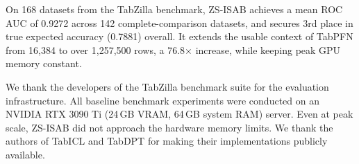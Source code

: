 \documentclass{article}
\begin{document}
On 168 datasets from the TabZilla benchmark, ZS-ISAB achieves a mean ROC AUC of 0.9272 across 142 complete-comparison datasets, and secures 3rd place in true expected accuracy (0.7881) overall. It extends the usable context of TabPFN from 16{,}384 to over 1{,}257{,}500 rows, a 76.8$\times$ increase, while keeping peak GPU memory constant.

We thank the developers of the TabZilla benchmark suite for the evaluation infrastructure. All baseline benchmark experiments were conducted on an NVIDIA RTX 3090 Ti (24\,GB VRAM, 64\,GB system RAM) server. Even at peak scale, ZS-ISAB did not approach the hardware memory limits. We thank the authors of TabICL and TabDPT for making their implementations publicly available.





\end{document}
